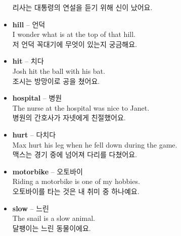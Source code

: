 \documentclass[12pt]{article}
\begin{document}
\begin{itemize}
    리사는 대통령의 연설을 듣기 위해 신이 났어요.
    \item \textbf{hill} -- 언덕 \\
    I wonder what is at the top of that hill. \\
    저 언덕 꼭대기에 무엇이 있는지 궁금해요.
    \item \textbf{hit} -- 치다 \\
    Josh hit the ball with his bat. \\
    조시는 방망이로 공을 쳤어요.
    \item \textbf{hospital} -- 병원 \\
    The nurse at the hospital was nice to Janet. \\
    병원의 간호사가 자넷에게 친절했어요.
    \item \textbf{hurt} -- 다치다 \\
    Max hurt his leg when he fell down during the game. \\
    맥스는 경기 중에 넘어져 다리를 다쳤어요.
    \item \textbf{motorbike} -- 오토바이 \\
    Riding a motorbike is one of my hobbies. \\
    오토바이를 타는 것은 내 취미 중 하나예요.
    \item \textbf{slow} -- 느린 \\
    The snail is a slow animal. \\
    달팽이는 느린 동물이에요.
\end{itemize}

\newpage
\end{document}
